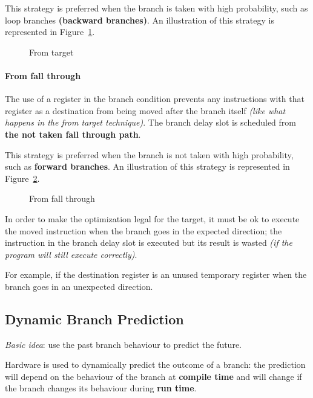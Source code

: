 \documentclass[english]{article}
\begin{document}
This strategy is preferred when the branch is taken with high probability, such as loop branches \textbf{(backward branches)}.
An illustration of this strategy is represented in Figure~\ref{fig:from-target}.

\begin{figure}[htbp]
  \bigskip
  \centering
  \caption{From target}
  \label{fig:from-target}
  \bigskip
\end{figure}

\paragraph{From fall through}

The use of a register in the branch condition prevents any instructions with that register as a destination from being moved after the branch itself \textit{(like what happens in the from target technique)}.
The branch delay slot is scheduled from \textbf{the not taken fall through path}.

This strategy is preferred when the branch is not taken with high probability, such as \textbf{forward branches}.
An illustration of this strategy is represented in Figure~\ref{fig:from-fall-through}.

\begin{figure}[htbp]
  \bigskip
  \centering
  \caption{From fall through}
  \label{fig:from-fall-through}
  \bigskip
\end{figure}

In order to make the optimization legal for the target, it must be ok to execute the moved instruction when the branch goes in the expected direction;
the instruction in the branch delay slot is executed but its result is wasted \textit{(if the program will still execute correctly)}.

For example, if the destination register is an unused temporary register when the branch goes in an unexpected direction.

\subsection{Dynamic Branch Prediction}
\label{sec:dynamic-branch-prediction}

\textit{Basic idea}: use the past branch behaviour to predict the future.

Hardware is used to dynamically predict the outcome of a branch: the prediction will depend on the behaviour of the branch at \textbf{compile time} and will change if the branch changes its behaviour during \textbf{run time}.
\end{document}
